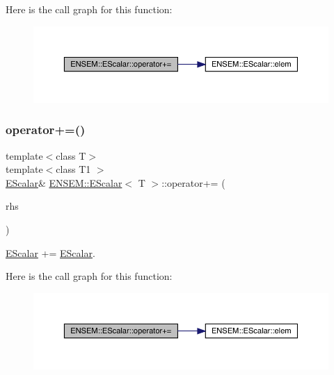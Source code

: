 Here is the call graph for this function\+:
\nopagebreak
\begin{figure}[H]
\begin{center}
\leavevmode
\includegraphics[width=350pt]{d0/d82/classENSEM_1_1EScalar_aa34f8bd686adb144a6d0e5e8f69787ce_cgraph}
\end{center}
\end{figure}
\mbox{\label{classENSEM_1_1EScalar_aa34f8bd686adb144a6d0e5e8f69787ce}} 
\subsubsection{\texorpdfstring{operator+=()}{operator+=()}\hspace{0.1cm}{\footnotesize\ttfamily [3/3]}}
{\footnotesize\ttfamily template$<$class T$>$ \\
template$<$class T1 $>$ \\
\mbox{\hyperlink{classENSEM_1_1EScalar}{E\+Scalar}}\& \mbox{\hyperlink{classENSEM_1_1EScalar}{E\+N\+S\+E\+M\+::\+E\+Scalar}}$<$ T $>$\+::operator+= (\begin{DoxyParamCaption}\item[{const \mbox{\hyperlink{classENSEM_1_1EScalar}{E\+Scalar}}$<$ T1 $>$ \&}]{rhs }\end{DoxyParamCaption})\hspace{0.3cm}{\ttfamily [inline]}}



\mbox{\hyperlink{classENSEM_1_1EScalar}{E\+Scalar}} += \mbox{\hyperlink{classENSEM_1_1EScalar}{E\+Scalar}}. 

Here is the call graph for this function\+:
\nopagebreak
\begin{figure}[H]
\begin{center}
\leavevmode
\includegraphics[width=350pt]{d0/d82/classENSEM_1_1EScalar_aa34f8bd686adb144a6d0e5e8f69787ce_cgraph}
\end{center}
\end{figure}
\mbox{\label{classENSEM_1_1EScalar_a2ed33688ab765d0e4d15b391b3f61f33}} 
